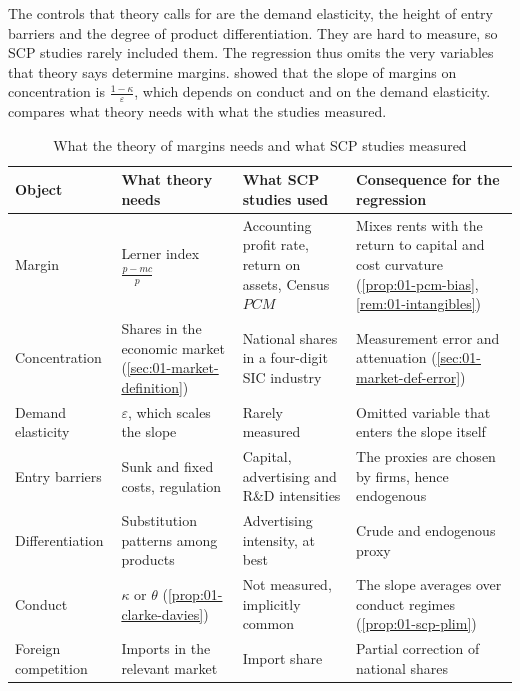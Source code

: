 The controls that theory calls for are the demand elasticity, the height of entry barriers and the degree
of product differentiation. They are hard to measure, so SCP studies rarely included them. The
regression thus omits the very variables that theory says determine margins. 
showed that the slope of margins on concentration is $\frac{1 - \kappa}{\varepsilon}$, which depends on
conduct and on the demand elasticity.  compares what theory needs with what the
studies measured.

\begin{table}[htbp]
\centering\footnotesize
\renewcommand{\arraystretch}{1.2}
\caption{What the theory of margins needs and what SCP studies measured}
\label{tab:01-scp-data}
\begin{tabularx}{\linewidth}{@{}>{\raggedright\arraybackslash}p{2.1cm}
  >{\raggedright\arraybackslash}X>{\raggedright\arraybackslash}X>{\raggedright\arraybackslash}X@{}}
\toprule
Object & What theory needs & What SCP studies used & Consequence for the regression \\
\midrule
Margin & Lerner index $\frac{p - mc}{p}$ & Accounting profit rate, return on assets, Census
  $\mathit{PCM}$ & Mixes rents with the return to capital and cost curvature
  (\cref{prop:01-pcm-bias}, \cref{rem:01-intangibles}) \\
Concentration & Shares in the economic market (\cref{sec:01-market-definition}) & National shares in a
  four-digit SIC industry & Measurement error and attenuation (\cref{sec:01-market-def-error}) \\
Demand elasticity & $\varepsilon$, which scales the slope & Rarely measured & Omitted variable that
  enters the slope itself \\
Entry barriers & Sunk and fixed costs, regulation & Capital, advertising and R\&D intensities &
  The proxies are chosen by firms, hence endogenous \\
Differentiation & Substitution patterns among products & Advertising intensity, at best & Crude and
  endogenous proxy \\
Conduct & $\kappa$ or $\theta$ (\cref{prop:01-clarke-davies}) & Not measured, implicitly common & The
  slope averages over conduct regimes (\cref{prop:01-scp-plim}) \\
Foreign competition & Imports in the relevant market & Import share & Partial correction of national
  shares \\
\bottomrule
\end{tabularx}
\end{table}

